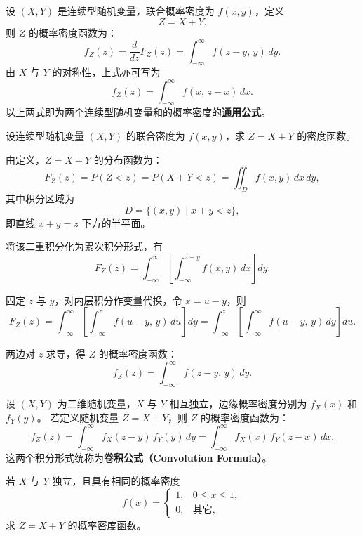 \begin{definition}[连续型随机变量和的概率密度通用公式]
设 $(X,Y)$ 是连续型随机变量，联合概率密度为 $f(x,y)$，定义
\[
Z=X+Y.
\]
则 $Z$ 的概率密度函数为：
\[
f_Z(z)=\frac{d}{dz}F_Z(z)
       =\int_{-\infty}^{\infty} f(z-y,\,y)\,dy.
\]
由 $X$ 与 $Y$ 的对称性，上式亦可写为
\[
f_Z(z)=\int_{-\infty}^{\infty} f(x,\,z-x)\,dx.
\]
以上两式即为两个连续型随机变量和的概率密度的\textbf{通用公式}。
\end{definition}









\begin{example}[连续型随机变量和的概率密度]
设连续型随机变量 $(X,Y)$ 的联合密度为 $f(x,y)$，求 $Z=X+Y$ 的密度函数。
\end{example}

\begin{solution}
由定义，$Z=X+Y$ 的分布函数为：
\[
F_Z(z)=P(Z<z)=P(X+Y<z)
=\iint_{D} f(x,y)\,dx\,dy,
\]
其中积分区域为
\[
D=\{(x,y)\mid x+y<z\},
\]
即直线 $x+y=z$ 下方的半平面。

将该二重积分化为累次积分形式，有
\[
F_Z(z)=\int_{-\infty}^{\infty}\!\left[\int_{-\infty}^{z-y} f(x,y)\,dx\right]dy.
\]

固定 $z$ 与 $y$，对内层积分作变量代换，令 $x=u-y$，则
\[
F_Z(z)=\int_{-\infty}^{\infty}\!\left[\int_{-\infty}^{z} f(u-y,\,y)\,du\right]dy
=\int_{-\infty}^{z}\!\left[\int_{-\infty}^{\infty} f(u-y,\,y)\,dy\right]du.
\]

两边对 $z$ 求导，得 $Z$ 的概率密度函数：
\[
f_Z(z)=\int_{-\infty}^{\infty} f(z-y,\,y)\,dy.
\]
\end{solution}
\begin{definition}
设 $(X,Y)$ 为二维随机变量，$X$ 与 $Y$ 相互独立，边缘概率密度分别为 $f_X(x)$ 和 $f_Y(y)$。  
若定义随机变量 $Z=X+Y$，则 $Z$ 的概率密度函数为：
\[
f_Z(z)
= \int_{-\infty}^{\infty} f_X(z-y)\,f_Y(y)\,dy
= \int_{-\infty}^{\infty} f_X(x)\,f_Y(z-x)\,dx.
\]
这两个积分形式统称为\textbf{卷积公式（Convolution Formula）}。
\end{definition}
\begin{example}[两个独立均匀分布随机变量之和的概率密度]
若 $X$ 与 $Y$ 独立，且具有相同的概率密度
\[
f(x)=
\begin{cases}
1, & 0\le x\le 1,\\[4pt]
0, & \text{其它},
\end{cases}
\]
求 $Z=X+Y$ 的概率密度函数。
\end{example}

